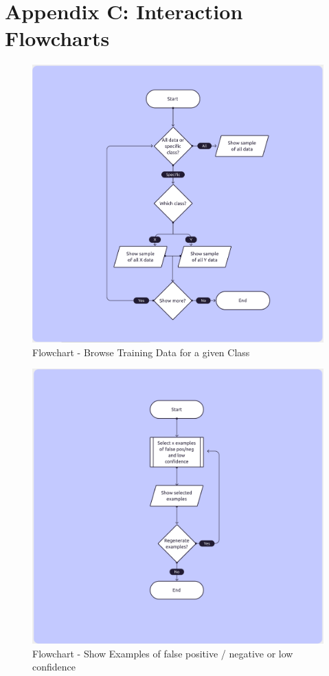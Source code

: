 {}
\section*{Appendix C: Interaction Flowcharts}\label{appendix:interaction_flowcharts}
\begin{figure}[htbp]
    \centering
    \includegraphics[width=\textwidth]{img/figures/flowcharts/browse_train_data_for_chosen_class.png}
    \caption{Flowchart - Browse Training Data for a given Class}
    \label{figure:flowchart_browse_data}
\end{figure}
\begin{figure}[htbp]
    \centering
    \includegraphics[width=\textwidth]{img/figures/flowcharts/show_examples_limits.png}
    \caption{Flowchart - Show Examples of false positive / negative or low confidence}
    \label{figure:flowchart_show_examples_limits}
\end{figure}
